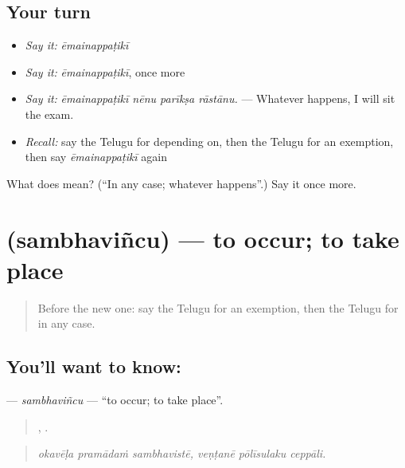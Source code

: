 \subsection*{Your turn}
\begin{itemize}
\raggedright
  \item \emph{Say it:} \emph{ēmainappaṭikī}
  \item \emph{Say it:} \emph{ēmainappaṭikī}, once more
  \item \emph{Say it:} \emph{ēmainappaṭikī nēnu parīkṣa rāstānu.} — Whatever happens, I will sit the exam.
  \item \emph{Recall:} say the Telugu for depending on, then the Telugu for an exemption, then say \emph{ēmainappaṭikī} again
\end{itemize}

\begin{tcolorbox}[breakable,colback=teal!4,colframe=teal!35!black,title={Before you move on}]
What does  mean? (\textquotedblleft{}In any case; whatever happens\textquotedblright{}.) Say it once more.
\end{tcolorbox}
\section[\texorpdfstring{\te{సంభవించు} (sambhaviñcu)}{సంభవించు (sambhaviñcu)}]{ (sambhaviñcu) — to occur; to take place}

\label{lesson:TE-C419-sambhavincu}



\begin{quote}
Before the new one: say the Telugu for an exemption, then the Telugu for in any case.
\end{quote}

\subsection*{You'll want to know: }
\textbf{} — \emph{sambhaviñcu} — \textquotedblleft{}to occur; to take place\textquotedblright{}.

\begin{quote}
  ,   .
\end{quote}

\begin{quote}
\emph{okavēḷa pramādaṁ sambhavistē, veṇṭanē pōlīsulaku ceppāli.}
\end{quote}

